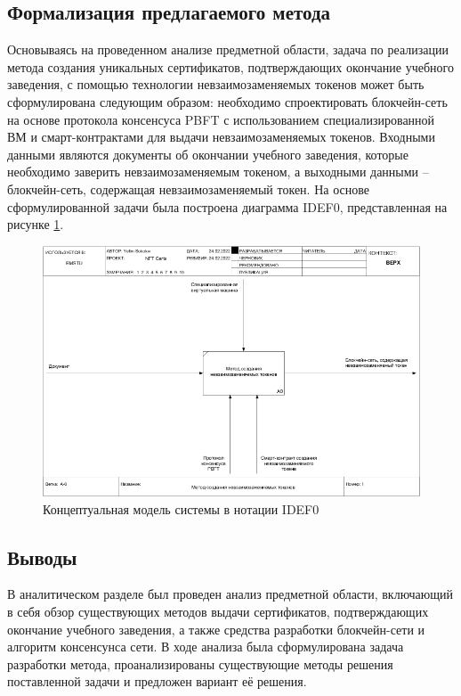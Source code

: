 \subsection{Формализация предлагаемого метода}

Основываясь на проведенном анализе предметной области, задача по реализации метода создания уникальных сертификатов, подтверждающих окончание учебного заведения, с помощью технологии невзаимозаменяемых токенов может быть сформулирована следующим образом: необходимо спроектировать блокчейн-сеть на основе протокола консенсуса PBFT с использованием специализированной ВМ и смарт-контрактами для выдачи невзаимозаменяемых токенов. Входными данными являются документы об окончании учебного заведения, которые необходимо заверить невзаимозаменяемым токеном, а выходными данными -- блокчейн-сеть, содержащая невзаимозаменяемый токен. На основе сформулированной задачи была построена диаграмма IDEF0, представленная на рисунке \ref{fig:a2}.

\begin{figure}[!ht]
	\centering
	\includegraphics[width=\textwidth]{img/idef0_base.png}
	\caption{Концептуальная модель системы в нотации IDEF0}
	\label{fig:a2}
\end{figure}



\subsection*{Выводы}
В аналитическом разделе был проведен анализ предметной области, включающий в себя обзор существующих методов выдачи сертификатов, подтверждающих окончание учебного заведения, а также средства разработки блокчейн-сети и алгоритм консенсунса сети. В ходе анализа была сформулирована задача разработки метода, проанализированы существующие методы решения поставленной задачи и предложен вариант её решения.


\pagebreak